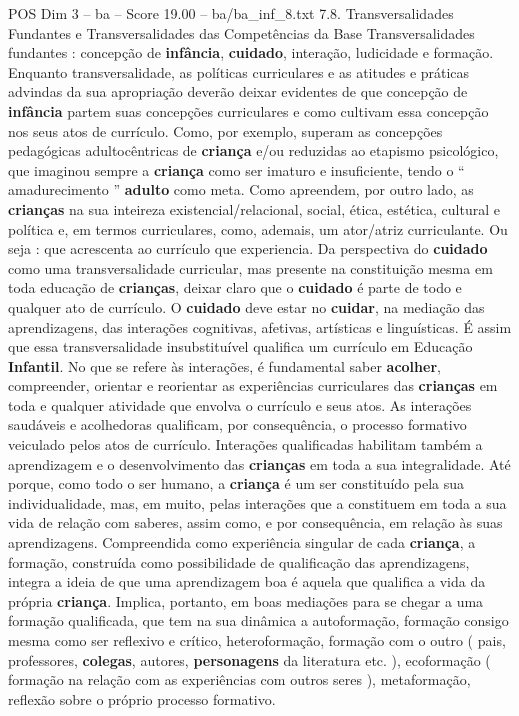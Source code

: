 \begin{textsample}{POS Dim 3 – ba – Score 19.00 – ba/ba\_inf\_8.txt}  \label{ex:f3_pos_173}
7.8.
Transversalidades Fundantes e Transversalidades das Competências da Base Transversalidades fundantes : concepção de \textbf{infância}, \textbf{cuidado}, interação, ludicidade e formação.
Enquanto transversalidade, as políticas curriculares e as atitudes e práticas advindas da sua apropriação deverão deixar evidentes de que concepção de \textbf{infância} partem suas concepções curriculares e como cultivam essa concepção nos seus atos de currículo.
Como, por exemplo, superam as concepções pedagógicas adultocêntricas de \textbf{criança} e/ou reduzidas ao etapismo psicológico, que imaginou sempre a \textbf{criança} como ser imaturo e insuficiente, tendo o “ amadurecimento ” \textbf{adulto} como meta.
Como apreendem, por outro lado, as \textbf{crianças} na sua inteireza existencial/relacional, social, ética, estética, cultural e política e, em termos curriculares, como, ademais, um ator/atriz curriculante.
Ou seja : que acrescenta ao currículo que experiencia.
Da perspectiva do \textbf{cuidado} como uma transversalidade curricular, mas presente na constituição mesma em toda educação de \textbf{crianças}, deixar claro que o \textbf{cuidado} é parte de todo e qualquer ato de currículo.
O \textbf{cuidado} deve estar no \textbf{cuidar}, na mediação das aprendizagens, das interações cognitivas, afetivas, artísticas e linguísticas.
É assim que essa transversalidade insubstituível qualifica um currículo em Educação \textbf{Infantil}.
No que se refere às interações, é fundamental saber \textbf{acolher}, compreender, orientar e reorientar as experiências curriculares das \textbf{crianças} em toda e qualquer atividade que envolva o currículo e seus atos.
As interações saudáveis e acolhedoras qualificam, por consequência, o processo formativo veiculado pelos atos de currículo.
Interações qualificadas habilitam também a aprendizagem e o desenvolvimento das \textbf{crianças} em toda a sua integralidade.
Até porque, como todo o ser humano, a \textbf{criança} é um ser constituído pela sua individualidade, mas, em muito, pelas interações que a constituem em toda a sua vida de relação com saberes, assim como, e por consequência, em relação às suas aprendizagens.
Compreendida como experiência singular de cada \textbf{criança}, a formação, construída como possibilidade de qualificação das aprendizagens, integra a ideia de que uma aprendizagem boa é aquela que qualifica a vida da própria \textbf{criança}.
Implica, portanto, em boas mediações para se chegar a uma formação qualificada, que tem na sua dinâmica a autoformação, formação consigo mesma como ser reflexivo e crítico, heteroformação, formação com o outro ( pais, professores, \textbf{colegas}, autores, \textbf{personagens} da literatura etc. ), ecoformação ( formação na relação com as experiências com outros seres ), metaformação, reflexão sobre o próprio processo formativo.

\end{textsample}
